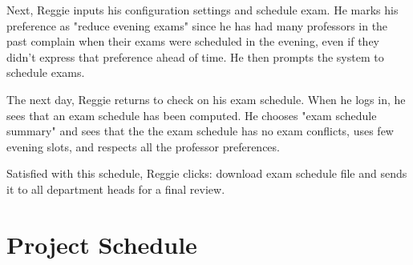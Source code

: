 \documentclass[11pt]{article}
\begin{document}
\begin{description}
Next, Reggie inputs his configuration settings and schedule exam.
He marks his preference as "reduce evening exams" since he has had many professors
in the past complain when their exams were scheduled in the evening, 
even if they didn't express that preference ahead of time. 
He then prompts the system to schedule exams.

The next day, Reggie returns to check on his exam schedule. 
When he logs in, he sees that an exam schedule has been computed. 
He chooses "exam schedule summary" and sees that
the the exam schedule has no exam conflicts, uses few evening slots, 
and respects all the professor preferences. 

Satisfied with this schedule, Reggie clicks: download exam schedule file
 and sends it to all department heads for a final review.


\end{description}

\section{Project Schedule} %
\end{document}
